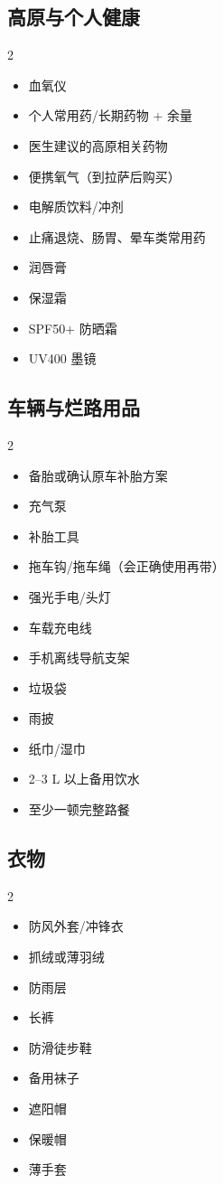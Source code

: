 \documentclass[10.5pt,a4paper]{ctexart}
\newcommand{\ck}{\(\square\)}
\begin{document}
\subsection{高原与个人健康}
\begin{multicols}{2}
\begin{itemize}[label=\ck]
  \item 血氧仪
  \item 个人常用药/长期药物 + 余量
  \item 医生建议的高原相关药物
  \item 便携氧气（到拉萨后购买）
  \item 电解质饮料/冲剂
  \item 止痛退烧、肠胃、晕车类常用药
  \item 润唇膏
  \item 保湿霜
  \item SPF50+ 防晒霜
  \item UV400 墨镜
\end{itemize}
\end{multicols}

\subsection{车辆与烂路用品}
\begin{multicols}{2}
\begin{itemize}[label=\ck]
  \item 备胎或确认原车补胎方案
  \item 充气泵
  \item 补胎工具
  \item 拖车钩/拖车绳（会正确使用再带）
  \item 强光手电/头灯
  \item 车载充电线
  \item 手机离线导航支架
  \item 垃圾袋
  \item 雨披
  \item 纸巾/湿巾
  \item 2--3 L 以上备用饮水
  \item 至少一顿完整路餐
\end{itemize}
\end{multicols}

\subsection{衣物}
\begin{multicols}{2}
\begin{itemize}[label=\ck]
  \item 防风外套/冲锋衣
  \item 抓绒或薄羽绒
  \item 防雨层
  \item 长裤
  \item 防滑徒步鞋
  \item 备用袜子
  \item 遮阳帽
  \item 保暖帽
  \item 薄手套
\end{itemize}
\end{multicols}
\end{document}

